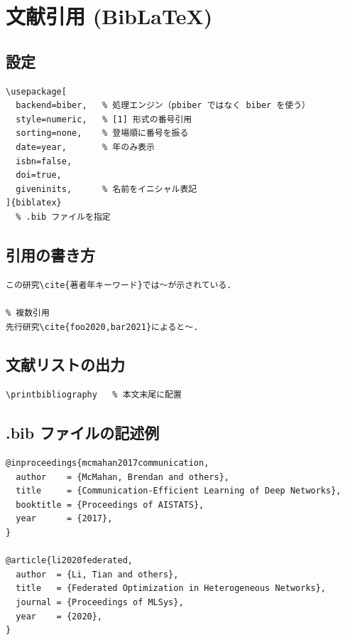 \documentclass[dvipdfmx, twocolumn, 10pt]{bxjsarticle}
\begin{document}
\section{文献引用 (BibLaTeX)}

\subsection{設定}

\begin{lstlisting}
\usepackage[
  backend=biber,   % 処理エンジン（pbiber ではなく biber を使う）
  style=numeric,   % [1] 形式の番号引用
  sorting=none,    % 登場順に番号を振る
  date=year,       % 年のみ表示
  isbn=false,
  doi=true,
  giveninits,      % 名前をイニシャル表記
]{biblatex}
  % .bib ファイルを指定
\end{lstlisting}

\subsection{引用の書き方}

\begin{lstlisting}
この研究\cite{著者年キーワード}では〜が示されている.

% 複数引用
先行研究\cite{foo2020,bar2021}によると〜.
\end{lstlisting}

\subsection{文献リストの出力}

\begin{lstlisting}
\printbibliography   % 本文末尾に配置
\end{lstlisting}

\subsection{.bib ファイルの記述例}

\begin{lstlisting}
@inproceedings{mcmahan2017communication,
  author    = {McMahan, Brendan and others},
  title     = {Communication-Efficient Learning of Deep Networks},
  booktitle = {Proceedings of AISTATS},
  year      = {2017},
}

@article{li2020federated,
  author  = {Li, Tian and others},
  title   = {Federated Optimization in Heterogeneous Networks},
  journal = {Proceedings of MLSys},
  year    = {2020},
}
\end{lstlisting}
\end{document}
